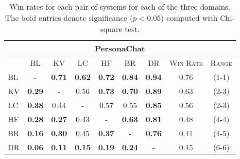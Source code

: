 \begin{table}[h!]
{\begin{tabular}{l|cccccc|cc}
\multicolumn{9}{c}{PersonaChat} \\
\toprule
\textsc{} & \textsc{BL}& \textsc{KV} &  \textsc{LC} &  \textsc{HF} & \textsc{BR}  & \textsc{DR} &\textsc{Win Rate} & \textsc{Range}\\
\hline 
\textsc{BL}& -             & \textbf{0.71} & \textbf{0.62} & \textbf{0.72} & \textbf{0.84} & \textbf{0.94} & 0.76     & (1-1) \\
\textsc{KV}& \textbf{0.29} & -             & 0.56          & \textbf{0.73} & \textbf{0.70} & \textbf{0.89} & 0.63     & (2-3)\\
\textsc{LC}& \textbf{0.38} & 0.44          & -             & 0.57          & 0.55          & \textbf{0.85} & 0.56     & (2-3)\\
\textsc{HF}& \textbf{0.28} & \textbf{0.27} & 0.43          & -             & \textbf{0.63} & \textbf{0.81} & 0.48     & (4-4)\\
\textsc{BR}& \textbf{0.16} & \textbf{0.30} & 0.45          & \textbf{0.37} & -             & \textbf{0.76} & 0.41     & (4-5) \\
\textsc{DR}& \textbf{0.06} & \textbf{0.11} & \textbf{0.15} & \textbf{0.19} & \textbf{0.24} & -             & 0.15     & (6-6) \\
\bottomrule
\end{tabular}
}
\caption{Win rates for each pair of systems for each of the three domains. The bold entries denote significance ($p < 0.05$) computed with Chi-square test.}
\label{tab:ssa-win-rates}
\end{table}